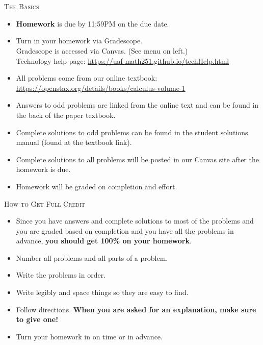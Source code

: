 \documentclass[11pt,fleqn]{article}
\begin{document}
\vspace*{-0.7in}

\begin{center}
  {\large{
  }}\\
\end{center}
\quad\\
\noindent \textsc{The Basics}\\
\begin{itemize}
\item \textbf{Homework} is due by 11:59PM on the due date. 
\item Turn in your homework via Gradescope. \\
Gradescope is accessed via Canvas. (See menu on left.)\\
Technology help page: 
\url{https://uaf-math251.github.io/techHelp.html}
\item All problems come from our online textbook:\\ \url{https://openstax.org/details/books/calculus-volume-1}
\item Answers to odd problems are linked from the online text and can be found in the back of the paper textbook.
\item Complete solutions to odd problems can be found in the student solutions manual (found at the textbook link).
\item Complete solutions to all problems will be posted in our Canvas site after the homework is due.
\item Homework will be graded on completion and effort. \\
\end{itemize}

\noindent \textsc{How to Get Full Credit}
\begin{itemize}
\item Since you have answers and complete solutions to most of the problems and you are graded based on completion and you have all the problems in advance, \textbf{you should get 100\% on your homework}.
\item Number all problems and all parts of a problem.
\item Write the problems in order.
\item Write legibly and space things so they are easy to find.
\item Follow directions. \textbf{When you are asked for an explanation, make sure to give one!}
\item Turn your homework in on time or in advance. \\
\end{itemize}
\end{document}

